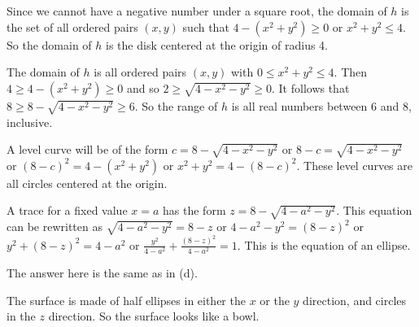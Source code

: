 \begin{exercises}
\begin{exerciseSolution}
    \ba
    \item Since we cannot have a negative number under a square root, the domain of $h$ is the set of all ordered pairs $(x,y)$ such that $4-(x^2+y^2) \geq 0$ or $x^2+y^2 \leq 4$. So the domain of $h$ is the disk centered at the origin of radius 4. 
    \item The domain of $h$ is all ordered pairs $(x,y)$ with $0 \leq x^2+y^2 \leq 4$. Then $4 \geq 4-(x^2+y^2) \geq 0$ and so $2 \geq \sqrt{4-x^2-y^2} \geq 0$. It follows that $8 \geq 8-\sqrt{4-x^2-y^2} \geq 6$. So the range of $h$ is all real numbers between 6 and 8, inclusive. 
    \item A level curve will be of the form $c = 8-\sqrt{4-x^2-y^2}$ or $8-c = \sqrt{4-x^2-y^2}$ or $(8-c)^2 = 4-(x^2+y^2)$ or $x^2+y^2 = 4-(8-c)^2$. These level curves are all circles centered at the origin. 
    \item A trace for a fixed value $x=a$ has the form $z = 8-\sqrt{4-a^2-y^2}$. This equation can be rewritten as $\sqrt{4-a^2-y^2} = 8-z$ or $4-a^2-y^2 = (8-z)^2$ or $y^2+(8-z)^2 = 4-a^2$ or $\frac{y^2}{4-a^2} + \frac{(8-z)^2}{4-a^2} = 1$. This is the equation of an ellipse. 
    \item The answer here is the same as in (d).
    \item The surface is made of half ellipses in either the $x$ or the $y$ direction, and circles in the $z$ direction. So the surface looks like a bowl.     \ea   

\end{exerciseSolution}


\end{exercises}
\afterexercises
